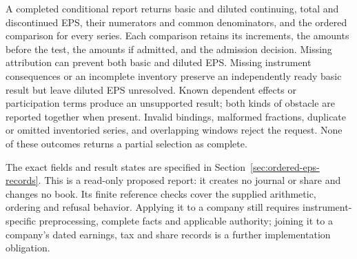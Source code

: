 A completed conditional report returns basic and diluted continuing, total
and discontinued EPS, their numerators and common denominators, and the
ordered comparison for every series. Each comparison retains its increments,
the amounts before the test, the amounts if admitted, and the admission
decision. Missing attribution can prevent both basic and diluted EPS. Missing
instrument consequences or an incomplete inventory preserve an independently
ready basic result but leave diluted EPS unresolved. Known dependent effects
or participation terms produce an unsupported result; both kinds of obstacle
are reported together when present. Invalid bindings, malformed fractions,
duplicate or omitted inventoried series, and overlapping windows reject the
request. None of these outcomes returns a partial selection as complete.

The exact fields and result states are specified in
Section~\ref{sec:ordered-eps-records}. This is a read-only proposed report:
it creates no journal or share and changes no book. Its finite reference
checks cover the supplied arithmetic, ordering and refusal behavior.
Applying it to a company still requires instrument-specific preprocessing,
complete facts and applicable authority; joining it to a company's dated
earnings, tax and share records is a further implementation obligation.
